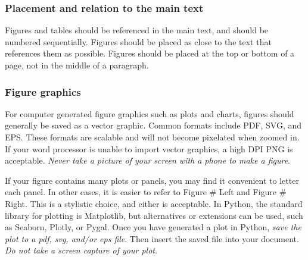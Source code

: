 \documentclass[]{article}
\begin{document}
\subsubsection{Placement and relation to the main text}
Figures and tables should be referenced in the main text, and should be numbered sequentially. Figures should be placed as close to the text that references them as possible. Figures should be placed at the top or bottom of a page, not in the middle of a paragraph.

\subsubsection{Figure graphics}
For computer generated figure graphics such as plots and charts, figures should generally be saved as a vector graphic. Common formats include PDF, SVG, and EPS. These formats are scalable and will not become pixelated when zoomed in. If your word processor is unable to import vector graphics, a high DPI PNG is acceptable. \emph{Never take a picture of your screen with a phone to make a figure}.

If your figure contains many plots or panels, you may find it convenient to letter each panel. In other cases, it is easier to refer to Figure \# Left and Figure \# Right. This is a stylistic choice, and either is acceptable.
In Python, the standard library for plotting is Matplotlib, but alternatives or extensions can be used, such as Seaborn, Plotly, or Pygal.
Once you have generated a plot in Python, \emph{save the plot to a pdf, svg, and/or eps file}. Then insert the saved file into your document. \emph{Do not take a screen capture of your plot}.
\end{document}
